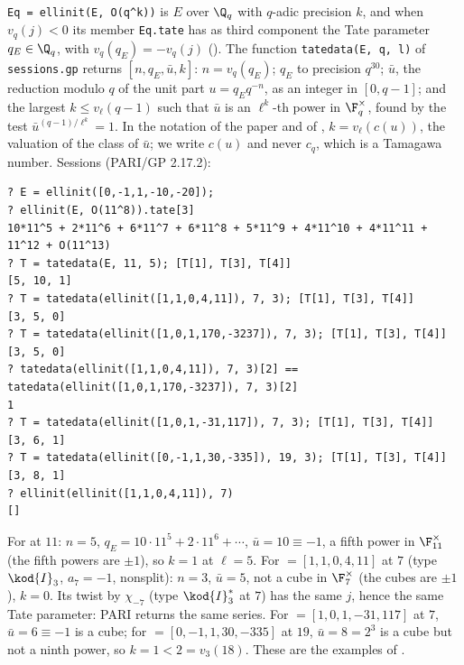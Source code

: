 \begin{sloppypar}
\begin{example}\label{ex:computation:tate-parameter}
\texttt{Eq = ellinit(E, O(q\^{}k))} is $E$ over $\Q_q$ with $q$-adic precision $k$, and when $v_q(j)<0$ its member \texttt{Eq.tate} has as third
component the Tate parameter $q_E\in\Q_q$, with $v_q(q_E)=-v_q(j)$ (). The function \texttt{tatedata(E, q, l)} of
\texttt{sessions.gp} returns $[n,q_E,\bar u,k]$: $n=v_q(q_E)$; $q_E$ to precision $q^{30}$; $\bar u$, the reduction modulo $q$ of the unit part
$u=q_Eq^{-n}$, as an integer in $[0,q-1]$; and the largest $k\le v_\ell(q-1)$ such that $\bar u$ is an $\ell^k$-th power in $\F_q^\times$, found by the
test $\bar u^{(q-1)/\ell^k}=1$. In the notation of the paper and of , $k=v_\ell(c(u))$, the valuation of the class of $\bar u$; we write
$c(u)$ and never $c_q$, which is a Tamagawa number. Sessions (PARI/GP 2.17.2):
\begin{lstlisting}[language=GP]
? E = ellinit([0,-1,1,-10,-20]);
? ellinit(E, O(11^8)).tate[3]
10*11^5 + 2*11^6 + 6*11^7 + 6*11^8 + 5*11^9 + 4*11^10 + 4*11^11 + 11^12 + O(11^13)
? T = tatedata(E, 11, 5); [T[1], T[3], T[4]]
[5, 10, 1]
? T = tatedata(ellinit([1,1,0,4,11]), 7, 3); [T[1], T[3], T[4]]
[3, 5, 0]
? T = tatedata(ellinit([1,0,1,170,-3237]), 7, 3); [T[1], T[3], T[4]]
[3, 5, 0]
? tatedata(ellinit([1,1,0,4,11]), 7, 3)[2] == tatedata(ellinit([1,0,1,170,-3237]), 7, 3)[2]
1
? T = tatedata(ellinit([1,0,1,-31,117]), 7, 3); [T[1], T[3], T[4]]
[3, 6, 1]
? T = tatedata(ellinit([0,-1,1,30,-335]), 19, 3); [T[1], T[3], T[4]]
[3, 8, 1]
? ellinit(ellinit([1,1,0,4,11]), 7)
[]
\end{lstlisting}
For  at $11$: $n=5$, $q_E=10\cdot11^5+2\cdot11^6+\cdots$, $\bar u=10\equiv-1$, a fifth power in $\F_{11}^\times$ (the fifth powers are $\pm1$), so
$k=1$ at $\ell=5$. For  $=[1,1,0,4,11]$ at $7$ (type $\kod{I}_3$, $a_7=-1$, nonsplit): $n=3$, $\bar u=5$, not a cube in $\F_7^\times$ (the cubes
are $\pm1$), $k=0$. Its twist  by $\chi_{-7}$ (type $\kod{I}_3^*$ at $7$) has the same $j$, hence the same Tate parameter: PARI returns
the same series. For  $=[1,0,1,-31,117]$ at $7$, $\bar u=6\equiv-1$ is a cube; for  $=[0,-1,1,30,-335]$ at $19$, $\bar u=8=2^3$ is a cube
but not a ninth power, so $k=1<2=v_3(18)$. These are the examples of .


\end{example}
\end{sloppypar}
